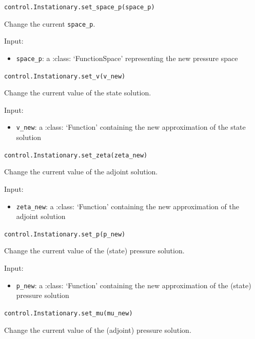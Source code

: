 \documentclass[letterpaper,10pt,english]{sphinxmanual}
\begin{document}
\vspace{3ex}

\texttt{control.Instationary.set{\_}space{\_}p(space{\_}p)}

Change the current \texttt{space\_p}.

Input:
\begin{itemize}
\item \texttt{space{\_}p}: a :class: `FunctionSpace' representing the new
            pressure space
\end{itemize}

\vspace{3ex}

\texttt{control.Instationary.set{\_}v(v{\_}new)}

Change the current value of the state solution.

Input:
\begin{itemize}
\item \texttt{v{\_}new}: a :class: `Function' containing the new approximation
            of the state solution
\end{itemize}

\vspace{3ex}

\texttt{control.Instationary.set{\_}zeta(zeta{\_}new)}

Change the current value of the adjoint solution.

Input:
\begin{itemize}
\item \texttt{zeta{\_}new}: a :class: `Function' containing the new approximation
            of the adjoint solution
\end{itemize}

\vspace{3ex}

\texttt{control.Instationary.set{\_}p(p{\_}new)}

Change the current value of the (state) pressure solution.

Input:
\begin{itemize}
\item \texttt{p{\_}new}: a :class: `Function' containing the new approximation
            of the (state) pressure solution
\end{itemize}

\vspace{3ex}

\texttt{control.Instationary.set{\_}mu(mu{\_}new)}

Change the current value of the (adjoint) pressure solution.
\end{document}
